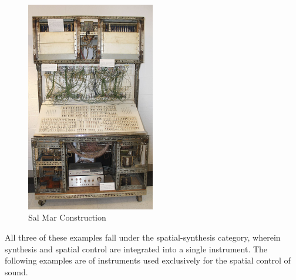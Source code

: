 \begin{figure}[ht!]%
\centering
\includegraphics[width=0.5\textwidth]{img/sal-mar.jpg} 
\caption{Sal Mar Construction \cite{FileTheS26online}}
\label{fig:sal-mar}
\end{figure}

All three of these examples fall under the spatial-synthesis category, wherein synthesis and spatial control are integrated into a single instrument. The following examples are of instruments used exclusively for the spatial control of sound.


